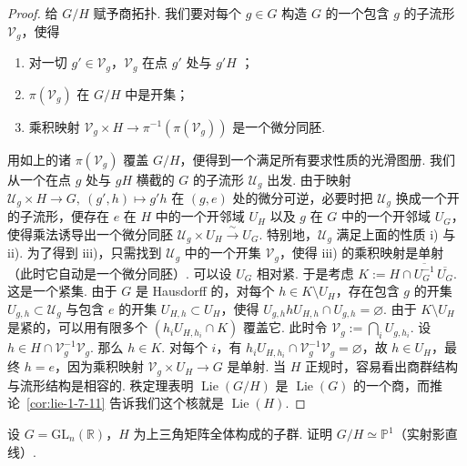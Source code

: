 \begin{proof}
给 $G/H$ 赋予商拓扑. 我们要对每个 $g\in G$ 构造 $G$ 的一个包含 $g$ 的子流形 $\mathcal V_{g}$，使得
\begin{enumerate}[label=\roman*)]
\item 对一切 $g'\in\mathcal V_{g}$，$\mathcal V_{g}$ 在点 $g'$ 处与 $g'H$ ；
\item $\pi(\mathcal V_{g})$ 在 $G/H$ 中是开集；
\item 乘积映射 $\mathcal V_{g}\times H\longrightarrow\pi^{-1}(\pi(\mathcal V_{g}))$ 是一个微分同胚.
\end{enumerate}
用如上的诸 $\pi(\mathcal V_{g})$ 覆盖 $G/H$，便得到一个满足所有要求性质的光滑图册.
我们从一个在点 $g$ 处与 $gH$ 横截的 $G$ 的子流形 $\mathcal U_{g}$ 出发. 由于映射 $\mathcal U_{g}\times H\longrightarrow G,\ (g',h)\mapsto g'h$ 在 $(g,e)$ 处的微分可逆，必要时把 $\mathcal U_{g}$ 换成一个开的子流形，便存在 $e$ 在 $H$ 中的一个开邻域 $U_{H}$ 以及 $g$ 在 $G$ 中的一个开邻域 $U_{G}$，使得乘法诱导出一个微分同胚 $\mathcal U_{g}\times U_{H}\xrightarrow{\ \sim\ }U_{G}$. 特别地，$\mathcal U_{g}$ 满足上面的性质 i) 与 ii).
为了得到 iii)，只需找到 $\mathcal U_{g}$ 中的一个开集 $\mathcal V_{g}$，使得 iii) 的乘积映射是单射（此时它自动是一个微分同胚）. 可以设 $U_{G}$ 相对紧. 于是考虑 $K:=H\cap\overline{U_{G}^{-1}}\,\overline{U_{G}}$. 这是一个紧集. 由于 $G$ 是 Hausdorff 的，对每个 $h\in K\setminus U_{H}$，存在包含 $g$ 的开集 $U_{g,h}\subset\mathcal U_{g}$ 与包含 $e$ 的开集 $U_{H,h}\subset U_{H}$，使得 $U_{g,h}hU_{H,h}\cap U_{g,h}=\varnothing$. 由于 $K\setminus U_{H}$ 是紧的，可以用有限多个 $(h_{i}U_{H,h_{i}}\cap K)$ 覆盖它. 此时令 $\mathcal V_{g}:=\bigcap_{i}U_{g,h_{i}}$. 设 $h\in H\cap\mathcal V_{g}^{-1}\mathcal V_{g}$. 那么 $h\in K$. 对每个 $i$，有 $h_{i}U_{H,h_{i}}\cap\mathcal V_{g}^{-1}\mathcal V_{g}=\varnothing$，故 $h\in U_{H}$，最终 $h=e$，因为乘积映射 $\mathcal V_{g}\times U_{H}\longrightarrow G$ 是单射.
当 $H$ 正规时，容易看出商群结构与流形结构是相容的. 秩定理表明 $\operatorname{Lie}(G/H)$ 是 $\operatorname{Lie}(G)$ 的一个商，而推论~\ref{cor:lie-1-7-11} 告诉我们这个核就是 $\operatorname{Lie}(H)$.
\end{proof}

\begin{exercise*}
设 $G=\mathrm{GL}_{n}(\mathbb R)$，$H$ 为上三角矩阵全体构成的子群. 证明 $G/H\simeq\mathbb P^{1}$（实射影直线）.
\end{exercise*}

